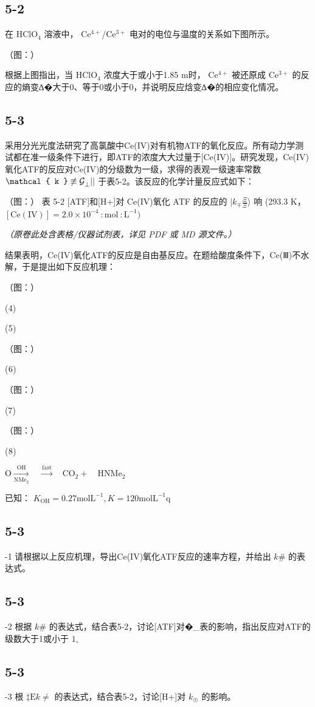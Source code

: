\subsection*{5-2}
在 $\mathrm { H C l O _ { 4 } }$ 溶液中， $\mathrm { C e ^ { 4 + } / C e ^ { 3 + } }$ 电对的电位与温度的关系如下图所⽰。

（图：）

根据上图指出，当 $\mathrm { H C l O _ { 4 } }$ 浓度⼤于或⼩于1.85 m时， $\mathrm { C e ^ { 4 + } }$ 被还原成 $\mathrm { C e ^ { 3 + } }$ 的反应的熵变∆�⼤于0、等于0或⼩于0，并说明反应焓变∆�的相应变化情况。

\subsection*{5-3}
采⽤分光光度法研究了⾼氯酸中Ce(IV)对有机物ATF的氧化反应。所有动⼒学测试都在准⼀级条件下进⾏，即ATF的浓度⼤⼤过量于[Ce(IV)]。研究发现，Ce(IV)氧化ATF的反应对Ce(IV)的分级数为⼀级，求得的表观⼀级速率常数 $\smash {  { \mathcal { k } } \not \equiv  { \mathcal { G } } _ { \perp } ^ { } } | |$ 于表5-2。该反应的化学计量反应式如下：

（图：）
表 5-2 [ATF]和[H+]对 Ce(IV)氧化 ATF 的反应的 $| k _ { \mp } \frac { \Xi } { \Xi } \rangle$ 响 (293.3 K， $[ \mathrm { C e } ( \mathrm { I V } ) ] = 2 . 0 { \times } 1 0 ^ { - 4 } \ : \mathrm { m o l } \ : \mathrm { L } ^ { - 1 } )$

\textit{（原卷此处含表格/仪器试剂表，详见 PDF 或 MD 源文件。）}

结果表明，Ce(IV)氧化ATF的反应是⾃由基反应。在题给酸度条件下，Ce(Ⅲ)不⽔解，于是提出如下反应机理：

（图：）

()

()

（图：）

()

（图：）

()

（图：）

()

$
\mathrm{O} \xrightarrow [ \mathrm{NMe} _ {2} ]{\mathrm{OH}} \quad \xrightarrow {\text {fast}} \quad \mathrm{CO} _ {2} + \quad \mathrm{HNMe} _ {2}\tag{6}
$

已知： $K _ { \mathrm { O H } } = 0 . 2 7 \mathrm { m o l } \mathrm { L } ^ { - 1 } , K = 1 2 0 \mathrm { m o l } \mathrm { L } ^ { - 1 } \mathrm { q }$

\subsection*{5-3}
-1 请根据以上反应机理，导出Ce(IV)氧化ATF反应的速率⽅程，并给出 $k \#$ 的表达式。

\subsection*{5-3}
-2 根据 $k \#$ 的表达式，结合表5-2，讨论[ATF]对�_{表}的影响，指出反应对ATF的级数⼤于1或⼩于 $1 _ { \circ }$

\subsection*{5-3}
-3 根 $\ddagger \boxed { \mathrm { E } } k \ne $ 的表达式，结合表5-2，讨论[H+]对 $k _ { ☉ }$ 的影响。
